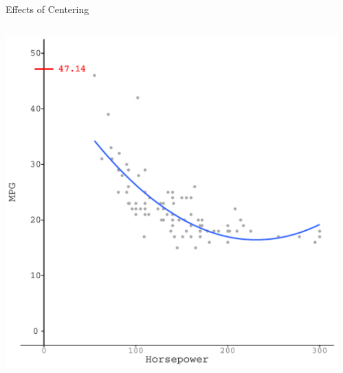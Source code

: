 \documentclass{beamer}\usepackage[]{graphicx}\usepackage[]{color}
\makeatletter
\def\maxwidth{ %
  \ifdim\Gin@nat@width>\linewidth
    \linewidth
  \else
    \Gin@nat@width
  \fi
}
\newenvironment{knitrout}{}{} %
\makeatother
\begin{document}
\begin{frame}{Effects of Centering}
  
  \begin{columns}
    \begin{column}{0.5\textwidth}
      
\begin{knitrout}\footnotesize
{}\color{fgcolor}

{\centering \includegraphics[width=\maxwidth]{figure/unnamed-chunk-33-1} 

}



\end{knitrout}

\end{column}
    
    \begin{column}{0.5\textwidth}
      
\begin{knitrout}\footnotesize
{}\color{fgcolor}


\end{knitrout}
\end{column}
\end{columns}
\end{frame}
\end{document}
